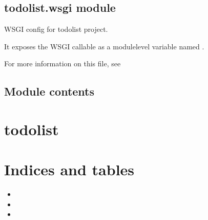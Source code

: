 \documentclass[letterpaper,10pt,english]{sphinxmanual}
\begin{document}
\section{todolist.wsgi module}
\label{\detokenize{todolist:module-todolist.wsgi}}\label{\detokenize{todolist:todolist-wsgi-module}}
\sphinxAtStartPar
WSGI config for todolist project.

\sphinxAtStartPar
It exposes the WSGI callable as a module\sphinxhyphen{}level variable named .

\sphinxAtStartPar
For more information on this file, see


\section{Module contents}
\label{\detokenize{todolist:module-todolist}}\label{\detokenize{todolist:module-contents}}
\sphinxstepscope


\chapter{todolist}
\label{\detokenize{modules:todolist}}\label{\detokenize{modules::doc}}

\chapter{Indices and tables}
\label{\detokenize{index:indices-and-tables}}\begin{itemize}
\item {} 
\sphinxAtStartPar
{}

\item {} 
\sphinxAtStartPar
{}

\item {} 
\sphinxAtStartPar
{}

\end{itemize}
\end{document}
